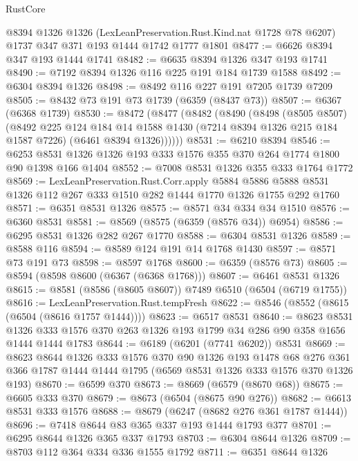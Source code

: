 \begin{lexlean}{RustCore}
\begin{coremodule}
    @8394
    @1326
    @1326
    (LexLeanPreservation.Rust.Kind.nat @1728 @78 @6207)
    @1737
    @347
    @371
    @193
    @1444
    @1742
    @1777
    @1801
@8477 := @6626 @8394 @347 @193 @1444 @1741
@8482 := @6635 @8394 @1326 @347 @193 @1741
@8490 := @7192 @8394 @1326 @116 @225 @191 @184 @1739 @1588
@8492 := @6304 @8394 @1326
@8498 := @8492 @116 @227 @191 @7205 @1739 @7209
@8505 := @8432 @73 @191 @73 @1739 (@6359 (@8437 @73))
@8507 := @6367 (@6368 @1739)
@8530 := @8472
    (@8477
      (@8482
        (@8490
          (@8498
            (@8505 @8507)
            (@8492
              @225
              @124
              @184
              @14
              @1588
              @1430
              (@7214 @8394 @1326 @215 @184 @1587 @7226)
              (@6461 @8394 @1326))))))
@8531 := @6210 @8394
@8546 := @6253 @8531 @1326 @1326 @193 @333 @1576 @355 @370 @264 @1774 @1800 @90 @1398 @166 @1404
@8552 := @7008 @8531 @1326 @355 @333 @1764 @1772
@8569 := LexLeanPreservation.Rust.Corr.apply
    @5884
    @5886
    @5888
    @8531
    @1326
    @112
    @267
    @333
    @1510
    @282
    @1444
    @1770
    @1326
    @1755
    @292
    @1760
@8571 := @6351 @8531 @1326
@8575 := @8571 @34 @334 @34 @1510
@8576 := @6360 @8531
@8581 := @8569 (@8575 (@6359 (@8576 @34)) @6954)
@8586 := @6295 @8531 @1326 @282 @267 @1770
@8588 := @6304 @8531 @1326
@8589 := @8588 @116
@8594 := @8589 @124 @191 @14 @1768 @1430
@8597 := @8571 @73 @191 @73
@8598 := @8597 @1768
@8600 := @6359 (@8576 @73)
@8605 := @8594 (@8598 @8600 (@6367 (@6368 @1768)))
@8607 := @6461 @8531 @1326
@8615 := @8581 (@8586 (@8605 @8607)) @7489 @6510 (@6504 (@6719 @1755))
@8616 := LexLeanPreservation.Rust.tempFresh
@8622 := @8546 (@8552 (@8615 (@6504 (@8616 @1757 @1444))))
@8623 := @6517 @8531
@8640 := @8623
    @8531
    @1326
    @333
    @1576
    @370
    @263
    @1326
    @193
    @1799
    @34
    @286
    @90
    @358
    @1656
    @1444
    @1444
    @1783
@8644 := @6189 (@6201 (@7741 @6202)) @8531
@8669 := @8623
    @8644
    @1326
    @333
    @1576
    @370
    @90
    @1326
    @193
    @1478
    @68
    @276
    @361
    @366
    @1787
    @1444
    @1444
    @1795
    (@6569 @8531 @1326 @333 @1576 @370 @1326 @193)
@8670 := @6599 @370
@8673 := @8669 (@6579 (@8670 @68))
@8675 := @6605 @333 @370
@8679 := @8673 (@6504 (@8675 @90 @276))
@8682 := @6613 @8531 @333 @1576
@8688 := @8679 (@6247 (@8682 @276 @361 @1787 @1444))
@8696 := @7418 @8644 @83 @365 @337 @193 @1444 @1793 @377
@8701 := @6295 @8644 @1326 @365 @337 @1793
@8703 := @6304 @8644 @1326
@8709 := @8703 @112 @364 @334 @336 @1555 @1792
@8711 := @6351 @8644 @1326

\end{coremodule}
\end{lexlean}
